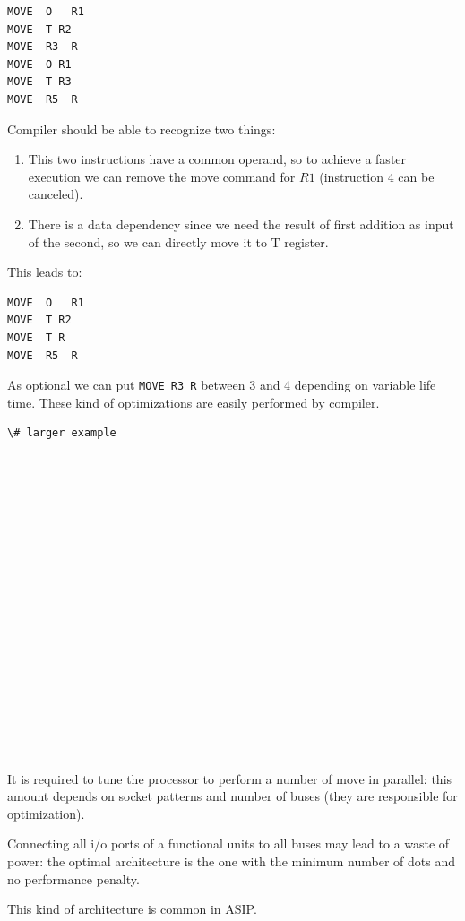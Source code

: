 \begin{verbatim}
MOVE  O   R1
MOVE  T R2
MOVE  R3  R
MOVE  O R1
MOVE  T R3
MOVE  R5  R
\end{verbatim}

Compiler should be able to recognize two things:
\begin{enumerate}
  \item This two instructions have a common operand, so to achieve a faster execution we can remove the move command for $R1$ (instruction 4 can be canceled).
  \item There is a data dependency since we need the result of first addition as input of the second, so we can directly move it to T register.
\end{enumerate}

This leads to:
\begin{verbatim}
MOVE  O   R1
MOVE  T R2
MOVE  T R
MOVE  R5  R
\end{verbatim}

As optional we can put \verb|MOVE R3 R| between 3 and 4 depending on variable life time. These kind of optimizations are easily performed by compiler.

\begin{verbatim}
\# larger example



















\end{verbatim}

It is required to tune the processor to perform a number of move in parallel: this amount depends on socket patterns and number of buses (they are responsible for optimization).

Connecting all i/o ports of a functional units to all buses may lead to a waste of power: the optimal architecture is the one with the minimum number of dots and no performance penalty.

This kind of architecture is common in ASIP.

